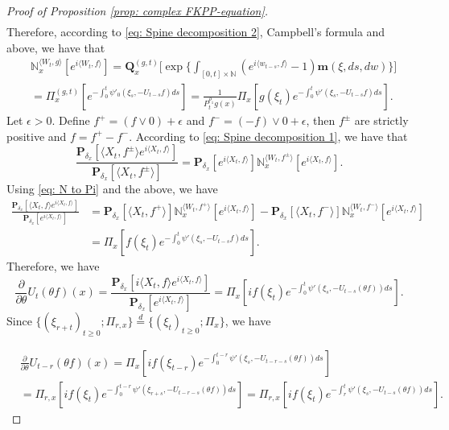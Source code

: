 \documentclass[12pt,a4paper]{amsart}
\theoremstyle{plain}
\theoremstyle{definition}
\numberwithin{equation}{section}
\begin{document}
\begin{proof}[Proof of Proposition \ref{prop: complex FKPP-equation}]
\begin{align}
\end{align}
    Therefore, according to \eqref{eq: Spine decomposition 2}, Campbell's formula and above, we have that
\begin{align}
\label{eq: N to Pi}
    &\mathbb N_x^{\langle W_{t}, g\rangle}[e^{i \langle W_t, f\rangle}]
    =\mathbf Q_x^{(g,t)} \Big[\exp\Big\{\int_{[0,t]\times \mathbb N}(e^{i \langle w_{t-s}, f\rangle} - 1) \mathbf m(\xi, ds,dw)\Big\}\Big]
    \\&= \Pi_x^{(g,t)} [e^{-\int_0^t \psi'_0(\xi_s, -U_{t-s}f)ds}]
    = \frac{1}{P_t^{\rho_1} g (x)} \Pi_x[ g(\xi_t) e^{-\int_0^t \psi'(\xi_s, -U_{t-s}f)ds} ].
\end{align}
    Let $\epsilon >0$.
    Define $f^+ = (f \vee 0) + \epsilon$ and $f^- = (-f) \vee 0 + \epsilon$, then $f^\pm$ are strictly positive and $f = f^+ - f^-$.
    According to \eqref{eq: Spine decomposition 1}, we have that
\begin{equation}
    \frac{\mathbf P_{\delta_x}[\langle X_t,f^{\pm}\rangle e^{i \langle X_t,f\rangle}]}{\mathbf P_{\delta_x}[\langle X_t,f^{\pm}\rangle ]}
    = \mathbf P_{\delta_x}[e^{i \langle X_t,f\rangle}] \mathbb N_x^{\langle W_t,f^{\pm}\rangle}[e^{i \langle X_t,f\rangle}].
\end{equation}
    Using \eqref{eq: N to Pi} and the above, we have
\begin{align}
    \frac{\mathbf P_{\delta_x}[\langle X_t, f\rangle e^{i \langle X_t, f\rangle}] }{\mathbf P_{\delta_x}[e^{i \langle X_t, f\rangle}]}
    &= \mathbf P_{\delta_x}[\langle X_t, f^+\rangle] \mathbb N_x^{\langle W_t, f^+\rangle} [e^{i \langle X_t, f\rangle}] - \mathbf P_{\delta_x}[\langle X_t, f^-\rangle]\mathbb N_x^{\langle W_t, f^-\rangle}[e^{i \langle X_t, f\rangle}]
    \\& = \Pi_x[ f(\xi_t) e^{- \int_0^t \psi'(\xi_s, -U_{t-s}f) ds}  ].
\end{align}
    Therefore, we have
\begin{equation}
    \frac{\partial}{\partial \theta} {U_t(\theta f)(x)}
    = \frac{\mathbf P_{\delta_x}[i\langle X_t, f\rangle e^{i \langle X_t, f\rangle}] }{\mathbf P_{\delta_x}[e^{i \langle X_t, f\rangle}]}
    =  \Pi_x[ if(\xi_t) e^{ - \int_0^t \psi'(\xi_s, -U_{t-s}(\theta f)) ds} ].
\end{equation}
    Since $\{(\xi_{r+t})_{t \geq 0}; \Pi_{r,x}\} \overset{d}{=} \{(\xi_{t})_{t\geq 0}; \Pi_{x}\} $, we have

\begin{align}
    &\frac{\partial}{\partial \theta} U_{t-r}(\theta f)( x)
    = \Pi_x[ i f(\xi_{t-r}) e^{-\int_0^{t-r} \psi'(\xi_s, -U_{t-r-s}(\theta f)) ds} ]
    \\&= \Pi_{r,x}[i f(\xi_t)e^{-\int_0^{t-r} \psi'(\xi_{r+s}, -U_{t-r-s}(\theta f)) ds} ]
    = \Pi_{r,x}[if(\xi_t)e^{-\int_r^t \psi'(\xi_{s}, -U_{t-s}(\theta f)) ds} ].
\end{align}


\end{proof}
\end{document}

